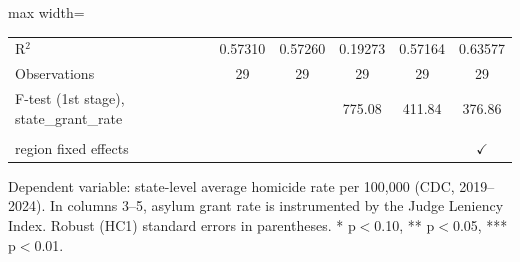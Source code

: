 \begin{table}[htbp]
\begin{adjustbox}{max width=\textwidth}
\begin{tabular}{lccccc}
       \\
      R$^2$                                    & 0.57310        & 0.57260        & 0.19273        & 0.57164        & 0.63577\\  
      Observations                             & 29             & 29             & 29             & 29             & 29\\  
      F-test (1st stage), state\_grant\_rate   &                &                & 775.08         & 411.84         & 376.86\\  
       \\
      region fixed effects                     &                &                &                &                & $\checkmark$\\   
      \bottomrule
   \end{tabular}
   \end{adjustbox}

   \par \raggedright
   Dependent variable: state-level average homicide rate per 100,000 (CDC, 2019--2024). In columns 3--5, asylum grant rate is instrumented by the Judge Leniency Index. Robust (HC1) standard errors in parentheses. * p$<$0.10, ** p$<$0.05, *** p$<$0.01.
\end{table}
